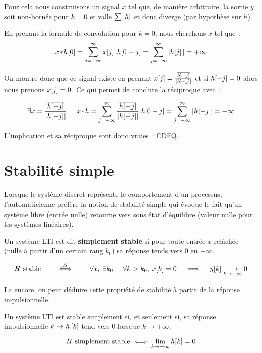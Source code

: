 \begin{demo}
  Pour cela nous construisons un signal $x$ tel que, de manière
  arbitraire, la sortie $y$ soit non-bornée pour $k=0$ et valle
  $\sum\left|h\right|$ et donc diverge (par hypothèse sur $h$).
  
  En prenant la formule de convolution pour $k=0$, nous cherchons
  $x$ tel que~:
  $$ x\!\ast\! h\!\left[0\right]= \sum\limits_{j=-\infty}^{\infty}{x\!\left[j\right].h\!\left[0-j\right]} =  \sum\limits_{j=-\infty}^{\infty}{|h\!\left[j\right]|} = +\infty$$
  
  On montre donc que ce signal existe en prenant
  $x[j]=\frac{\overline{h\!\left[-j\right]}}{\left|h\!\left[-j\right]\right|}$ et si
  $h\!\left[-j\right]=0$ alors nous prenons $x\!\left[j\right]=0$.  Ce qui permet de
  conclure la réciproque avec~:
  
  $$\exists x=\frac{\overline{h\ded{-j}}}{\abs{h\ded{-j}}} \tq x\conv h = \somme{j=-\infty}{\infty}{\frac{\overline{h\ded{-j}}}{\abs{h\ded{-j}}}.h\ded{0-j}}= \somme{j=-\infty}{\infty}{\abs{h\ded{-j}}}=+\infty$$

  L'implication et sa réciproque sont donc vraies~: CDFQ.
  
\end{demo}


\section{Stabilité simple}
Lorsque le système discret représente le comportement d'un processus,
l'automaticienne préfère la notion de stabilité simple qui évoque le
fait qu'un système libre (entrée nulle) retourne vers sons état
d'équilibre (valeur nulle pour les systèmes linéaires).

\begin{definition} Un système LTI est dit \textbf{simplement stable}
  si pour toute entrée $x$ relâchée (nulle à partir d'un certain rang
  $k_0$) sa réponse tends vers 0 en $+\infty$.

  $$H \text{ stable}\quad\quad \overset{\Delta}{\iff}\quad \quad\forall x,\; \exists k_0 \mathrel{}\mid\mathrel{} \;\;{} \forall k>k_0, \; x\!\left[k\right]=0 \quad\implies\quad y\!\left[k\right] \underset{k\to+\infty}{\longrightarrow} 0  $$
\end{definition}

La encore, on peut déduire cette propriété de stabilité à partir de la
réponse impulsionnelle.

\begin{theoreme}
  Un système LTI est stable simplement si, et seulement si, sa réponse
  impulsionnelle $k\mapsto h\left[k\right]$ tend vers 0 lorsque $k\to +\infty$.
  
  $$ H \text{ simplement stable} \iff \lim_{k\to+\infty} h\!\left[k\right] = 0 $$
\end{theoreme}


